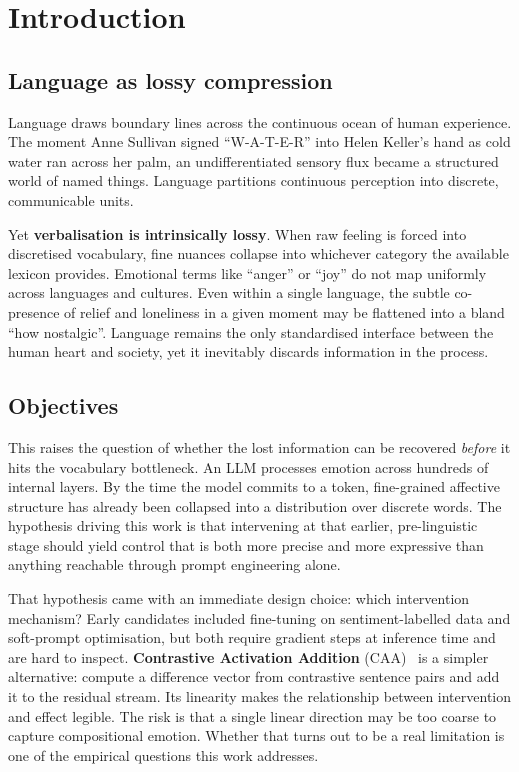 \chapter{Introduction}
\label{chap:introduction}

\section{Language as lossy compression}
Language draws boundary lines across the continuous ocean of human experience. The moment Anne Sullivan signed ``W-A-T-E-R'' into Helen Keller's hand as cold water ran across her palm, an undifferentiated sensory flux became a structured world of named things. Language partitions continuous perception into discrete, communicable units.

Yet \textbf{verbalisation is intrinsically lossy}. When raw feeling is forced into discretised vocabulary, fine nuances collapse into whichever category the available lexicon provides. Emotional terms like ``anger'' or ``joy'' do not map uniformly across languages and cultures\cite{jackson2019emotion}. Even within a single language, the subtle co-presence of relief and loneliness in a given moment may be flattened into a bland ``how nostalgic''. Language remains the only standardised interface between the human heart and society, yet it inevitably discards information in the process.


\section{Objectives}

This raises the question of whether the lost information can be recovered \emph{before} it hits the vocabulary bottleneck. An LLM processes emotion across hundreds of internal layers. By the time the model commits to a token, fine-grained affective structure has already been collapsed into a distribution over discrete words. The hypothesis driving this work is that intervening at that earlier, pre-linguistic stage should yield control that is both more precise and more expressive than anything reachable through prompt engineering alone.

That hypothesis came with an immediate design choice: which intervention mechanism? Early candidates included fine-tuning on sentiment-labelled data and soft-prompt optimisation, but both require gradient steps at inference time and are hard to inspect. \textbf{Contrastive Activation Addition} (CAA)~\cite{caa} is a simpler alternative: compute a difference vector from contrastive sentence pairs and add it to the residual stream. Its linearity makes the relationship between intervention and effect legible. The risk is that a single linear direction may be too coarse to capture compositional emotion. Whether that turns out to be a real limitation is one of the empirical questions this work addresses.

